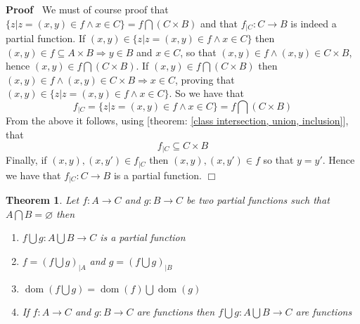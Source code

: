 \documentclass{book}
\newcommand{\tmop}[1]{\ensuremath{\operatorname{#1}}}
\newenvironment{proof}{\noindent\textbf{Proof\ }}{\hspace*{\fill}$\Box$\medskip}
\newtheorem{theorem}{Theorem}
\begin{document}
\begin{proof}
  We must of course proof that $\{ z|z = (x, y) \in f \wedge x \in C \} = f
  \bigcap (C \times B)$ and that $f_{|C} : C \rightarrow B$ is indeed a
  partial function. If $(x, y) \in \{ z|z = (x, y) \in f \wedge x \in C \}$
  then $(x, y) \in f \subseteq A \times B \Rightarrow y \in B$ and $x \in C$,
  so that $(x, y) \in f \wedge (x, y) \in C \times B$, hence $(x, y) \in f
  \bigcap (C \times B)$. If $(x, y) \in f \bigcap (C \times B)$ then $(x, y)
  \in f \wedge (x, y) \in C \times B \Rightarrow x \in C$, proving that $(x,
  y) \in \{ z|z = (x, y) \in f \wedge x \in C \}$. So we have that
  \[ f_{|C} = \{ z|z = (x, y) \in f \wedge x \in C \} = f \bigcap (C \times
     B) \]
  From the above it follows, using [theorem: \ref{class intersection, union,
  inclusion}], that
  \[ f_{|C} \subseteq C \times B \]
  Finally, if $(x, y), (x, y') \in f_{|C}$ then $(x, y), (x, y') \in f$ so
  that $y = y'$. Hence we have that $f_{|C} : C \rightarrow B$ is a partial
  function.
\end{proof}

\begin{theorem}
  \label{function combining functions (1)}Let $f : A \rightarrow C$ and $g : B
  \rightarrow C$ be two partial functions such that $A \bigcap B =
  \varnothing$ then
  \begin{enumerate}
    \item $f \bigcup g : A \bigcup B \rightarrow C$ is a partial function
    
    \item $f = \left( f \bigcup g \right)_{|A}$ and $g = \left( f \bigcup g
    \right)_{|B}$
    
    \item $\tmop{dom} \left( f \bigcup g \right) = \tmop{dom} (f) \bigcup
    \tmop{dom} (g)$
    
    \item If $f : A \rightarrow C$ and $g : B \rightarrow C$ are functions
    then $f \bigcup g : A \bigcup B \rightarrow C$ are functions
  \end{enumerate}
\end{theorem}
\end{document}
